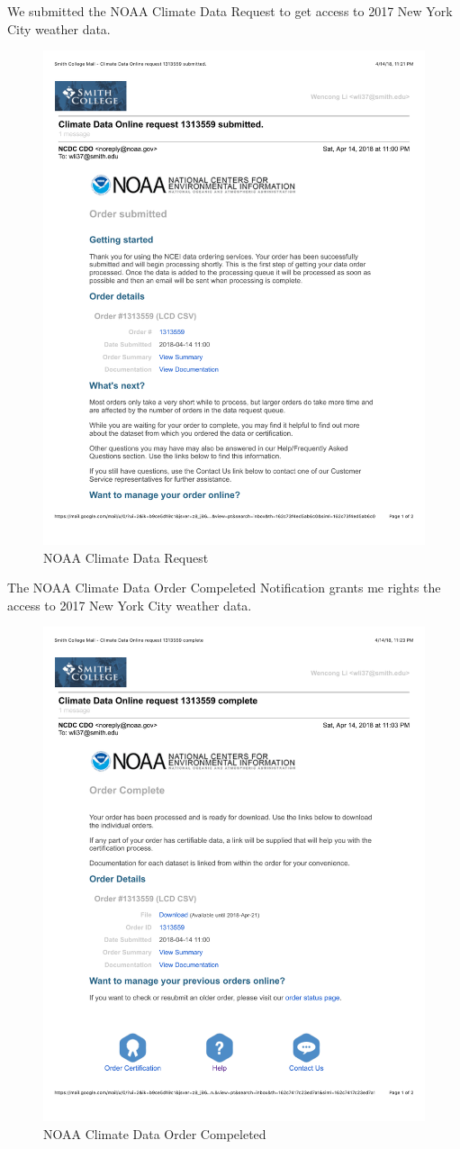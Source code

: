 \documentclass[12pt,twoside]{reedthesis}
\theoremstyle{definition}
\theoremstyle{definition}
\theoremstyle{definition}
\theoremstyle{remark}
\begin{document}
We submitted the NOAA Climate Data Request to get access to 2017 New
York City weather data.
\begin{figure}
  \centering
  \includegraphics[width=4.5in]{figure/app_noaa_request.pdf}
  \caption{NOAA Climate Data Request}
\end{figure}
The NOAA Climate Data Order Compeleted Notification grants me rights the
access to 2017 New York City weather data.
\begin{figure}
  \centering
  \includegraphics[width=4.5in]{figure/app_noaa_com.pdf}
  \caption{NOAA Climate Data Order Compeleted}
\end{figure}
\backmatter
\end{document}
